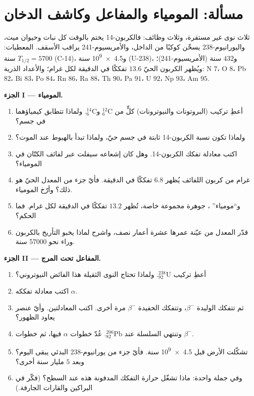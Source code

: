 \section{مسألة: المومياء والمفاعل وكاشف الدخان}

\begin{problem}
\label{pb:g11:nucleus-radioactivity:1}
ثلاث نوى غير مستقرة، وثلاث وظائف: فالكربون-14 يختم بالوقت كل نبات
وحيوان ميت، واليورانيوم-238 يسخّن كوكبًا من الداخل، والأمريسيوم-241 يراقب
الأسقف. المعطيات: $T_{1/2} = \num{5700}$ سنة (C-14)، و\num{4.5e9} سنة
(U-238)، و$432$ سنة (الأمريسيوم-241)؛ ويُظهر الكربون الحيّ $13.6$ تفككًا في الدقيقة
لكل غرام؛ والأعداد الذرية: N $7$، O $8$، Pb $82$، Bi $83$، Po $84$، Rn $86$،
Ra $88$، Th $90$، Pa $91$، U $92$، Np $93$، Am $95$.

\medskip
\noindent\textbf{الجزء I --- المومياء.}
\begin{enumerate}
  \item أعطِ تركيب (البروتونات والنيوترونات) كلٍّ من ${}^{12}_{6}\mathrm{C}$
        و${}^{14}_{6}\mathrm{C}$. ولماذا تتطابق كيمياؤهما في جسم؟
  \item ولماذا تكون نسبة الكربون-14 ثابتة في جسم حيّ، ولماذا
        تبدأ بالهبوط عند الموت؟
  \item اكتب معادلة تفكك الكربون-14. وهل كان إشعاعه سيفلت
        عبر لفائف الكتّان في المومياء؟
  \item غرام من كربون اللفائف يُظهر $6.8$ تفككًا في الدقيقة.
        فأيّ جزء من المعدل الحيّ هو ذلك؟ وأرّخ المومياء.
  \item و``مومياء'' ، جوهرة مجموعة خاصة، تُظهر
        $13.2$ تفككًا في الدقيقة لكل غرام. فما الحكم؟
  \item قدّر المعدل من عيّنة عمرها عشرة أعمار نصف، واشرح
        لماذا يخبو التأريخ بالكربون وراء نحو \num{57000} سنة.
\end{enumerate}

\medskip
\noindent\textbf{الجزء II --- المفاعل تحت المرج.}
\begin{enumerate}[resume]
  \item أعطِ تركيب ${}^{238}_{92}\mathrm{U}$. ولماذا تحتاج النوى الثقيلة
        هذا الفائض النيوتروني؟
  \item اكتب معادلة تفككه $\alpha$.
  \item ثم تتفكك الوليدة $\beta^-$، وتتفكك الحفيدة
        $\beta^-$ مرة أخرى. اكتب المعادلتين. وأيّ عنصر يعاود الظهور؟
  \item وتنتهي السلسلة عند ${}^{206}_{82}\mathrm{Pb}$. عُدّ خطوات $\alpha$
        فيها، ثم خطوات $\beta^-$.
  \item تشكّلت الأرض قبل \num{4.5e9} سنة. فأيّ جزء من يورانيوم-238
        البدئي يبقى اليوم؟ وبعد $5$ مليار سنة أخرى؟
  \item وفي جملة واحدة: ماذا تشغّل حرارة التفكك المدفونة هذه عند
        السطح؟ (فكّر في البراكين والقارات الجارفة.)
\end{enumerate}


\end{problem}
